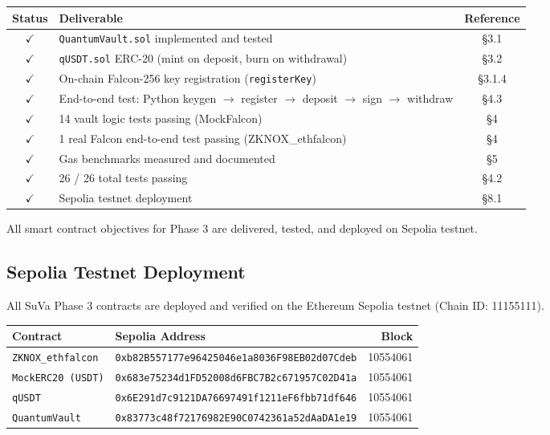 \documentclass[11pt,a4paper]{article}
\begin{document}
\begin{center}
\begin{tabular}{clc}
\toprule
\textbf{Status} & \textbf{Deliverable} & \textbf{Reference} \\
\midrule
$\checkmark$ & \texttt{QuantumVault.sol} implemented and tested & \S3.1 \\
$\checkmark$ & \texttt{qUSDT.sol} ERC-20 (mint on deposit, burn on withdrawal) & \S3.2 \\
$\checkmark$ & On-chain Falcon-256 key registration (\texttt{registerKey}) & \S3.1.4 \\
$\checkmark$ & End-to-end test: Python keygen $\to$ register $\to$ deposit $\to$ sign $\to$ withdraw & \S4.3 \\
$\checkmark$ & 14 vault logic tests passing (MockFalcon) & \S4 \\
$\checkmark$ & 1 real Falcon end-to-end test passing (ZKNOX\_ethfalcon) & \S4 \\
$\checkmark$ & Gas benchmarks measured and documented & \S5 \\
$\checkmark$ & 26 / 26 total tests passing & \S4.2 \\
$\checkmark$ & Sepolia testnet deployment & \S8.1 \\
\bottomrule
\end{tabular}
\end{center}

\vspace{0.4cm}

\begin{resultbox}
All smart contract objectives for Phase 3 are delivered, tested, and deployed on Sepolia testnet.
\end{resultbox}

\newpage
\subsection{Sepolia Testnet Deployment}
\label{sec:sepolia}

All SuVa Phase 3 contracts are deployed and verified on the Ethereum Sepolia testnet (Chain ID: 11155111).

\begin{center}
\begin{tabular}{llr}
\toprule
\textbf{Contract} & \textbf{Sepolia Address} & \textbf{Block} \\
\midrule
\texttt{ZKNOX\_ethfalcon} & \texttt{0xb82B557177e96425046e1a8036F98EB02d07Cdeb} & 10554061 \\
\texttt{MockERC20 (USDT)} & \texttt{0x683e75234d1FD52008d6FBC7B2c671957C02D41a} & 10554061 \\
\texttt{qUSDT}            & \texttt{0x6E291d7c9121DA76697491f1211eF6fbb71df646} & 10554061 \\
\texttt{QuantumVault}     & \texttt{0x83773c48f72176982E90C0742361a52dAaDA1e19} & 10554061 \\
\bottomrule
\end{tabular}
\end{center}
\end{document}
